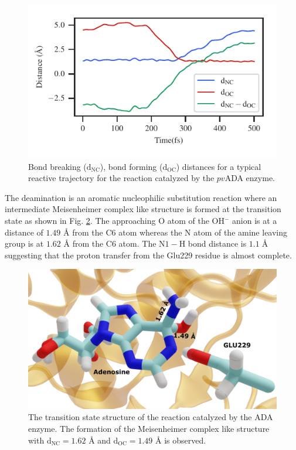 \documentclass[journal=jpcbfk,manuscript=article,layout=traditional]{achemso}
\begin{document}
\begin{figure}[ht!]
\includegraphics[scale=1.0]{figures/ada-diff60.pdf}
\caption{Bond breaking ($\mathrm{d}_{\mathrm{NC}}$), bond forming 
($\mathrm{d}_{\mathrm{OC}}$) distances for a typical 
reactive trajectory for the reaction catalyzed by the $pv$ADA enzyme.}
\label{fig:ada-reactive-traj}
\end{figure}
The deamination is an aromatic nucleophilic substitution reaction 
where an intermediate Meisenheimer complex like structure is formed 
at the transition state as shown in Fig. \ref{fig:ada-trans}. 
The approaching O atom of the OH$^{-}$ anion is at a distance of $1.49$ {\AA}
from the C6 atom whereas the N atom of the amine leaving group is at $1.62$ {\AA}
from the C6 atom.
The N$1-$H bond distance is $1.1\;${\AA} 
suggesting that the proton transfer from the Glu229 residue is almost complete.
\begin{figure}
\centering
\includegraphics[scale=0.12]{figures/new-ada-trans.png}
\caption{The transition state structure of the reaction catalyzed by the ADA enzyme.
The formation of the Meisenheimer complex like structure with 
d$_{\text{NC}}=1.62$ {\AA} and d$_{\text{OC}}=1.49$ {\AA} is observed.}
\label{fig:ada-trans}
\end{figure}
\end{document}
